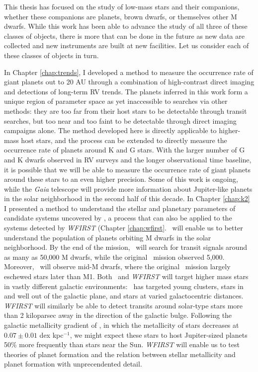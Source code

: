 This thesis has focused on the study of low-mass stars and their companions,
whether these companions are planets, brown dwarfs, or themselves other M dwarfs.
While this work has been able to advance the study of all three of these classes of
objects, there is more that can be done in the future as new data are collected and new
instruments are built at new facilities.
Let us consider each of these classes of objects in turn.

In Chapter \ref{chap:trends}, I developed a method to measure the occurrence rate of giant
planets out to 20 AU through a combination of high-contrast direct imaging and 
detections of long-term RV trends.
The planets inferred in this work form a unique region of parameter space as yet 
inaccessible to searches via other methods:
they are too far from their host stars to be detectable through transit searches,
but too near and too faint to be detectable through direct imaging campaigns alone.
The method developed here is directly applicable to higher-mass host stars, and the
process can be extended to directly measure the occurrence rate of planets around K and G
stars.
With the larger number of G and K dwarfs observed in RV surveys and the longer observational
time baseline, it is possible that we will be able to measure the occurrence rate of 
giant planets around these stars to an even higher precision.
Some of this work is ongoing, while the \textit{Gaia} telescope will provide more  information about Jupiter-like planets in the solar neighborhood in the second half of
this decade.
In Chapter \ref{chap:k2} I presented a method to understand the stellar and planetary parameters of candidate systems uncovered by \KT, a process that can also be applied to the systems detected by \textit{WFIRST} (Chapter \ref{chap:wfirst}. 
\KT\ will enable us to better understand the population of planets orbiting M dwarfs 
in the solar neighborhood. 
By the end of the mission, \KT\ will search for transit signals
around as many as 50,000 M dwarfs, while the original \kep\ mission observed 5,000.
Moreover, \KT\ will observe mid-M dwarfs, where the original \kep\ mission largely eschewed
stars later than M1.
Both \KT\ and \textit{WFIRST} will target higher mass stars in vastly different galactic
environments: \KT\ has targeted young clusters, stars in and well out of the galactic 
plane, and stars at varied galactocentric distances.
\textit{WFIRST} will similarly be able to detect transits around solar-type stars
more than 2 kiloparsec away in the direction of the galactic bulge. 
Following the galactic metallicity gradient of \citep{Rolleston00}, in which the 
metallicity of stars decreases at $0.07 \pm 0.01$ dex kpc$^{-1}$, we might expect
these stars to host Jupiter-sized planets 50\% more frequently than stars
near the Sun.
\textit{WFIRST} will enable us to test theories of planet formation and the relation
between stellar metallicity and planet formation with unprecendented detail.

